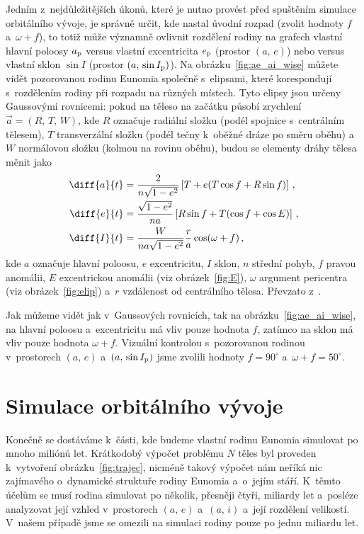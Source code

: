 \documentclass[A4paper, 12pt, oneside]{book}
\begin{document}
Jedním z~nejdůležitějších úkonů, které je nutno provést před spuštěním simulace orbitálního vývoje, je správně určit, kde nastal úvodní rozpad (zvolit hodnoty $f$ a~$\omega+f$), to totiž může významně ovlivnit rozdělení rodiny na grafech vlastní hlavní poloosy $a_{\rm p}$ versus vlastní excentricita $e_{\rm p}$ (prostor $(a,\,e)$) nebo versus vlastní sklon $\sin I$ (prostor $(a,\,\sin I_{\rm p})$). Na obrázku~\ref{fig:ae_ai_wise} můžete vidět pozorovanou rodinu Eunomia společně s~elipsami, které korespondují s~rozdělením rodiny při rozpadu na různých místech. Tyto elipsy jsou určeny Gaussovými rovnicemi: pokud na těleso na začátku působí zrychlení $\vec{a}=(R,\,T,\,W)$, kde $R$ označuje radiální složku (podél spojnice s~centrálním tělesem), $T$ transverzální složku (podél tečny k~oběžné dráze po směru oběhu) a~$W$ normálovou složku (kolmou na rovinu oběhu), budou se elementy dráhy tělesa měnit jako
\begin{align}
	\diff{a}{t}&=\frac{2}{n\sqrt{1-e^2}}\left[T+e(T\cos f+R\sin f)\right] \,, \\
	\diff{e}{t}&=\frac{\sqrt{1-e^2}}{na}\left[R\sin f+T(\cos f+\cos E)\right]\,, \\
	\diff{I}{t}&=\frac{W}{na\sqrt{1-e^2}}\frac{r}{a}\cos(\omega+f)\,,
\end{align}
kde $a$ označuje hlavní poloosu, $e$ excentricitu, $I$ sklon, $n$ střední pohyb, $f$ pravou anomálii, $E$ excentrickou anomálii (viz obrázek~\ref{fig:E}), $\omega$ argument pericentra (viz obrázek~\ref{fig:elip}) a~$r$ vzdálenost od centrálního tělesa. Převzato z~\cite{fmt}.

Jak můžeme vidět jak v~Gaussových rovnicích, tak na obrázku~\ref{fig:ae_ai_wise}, na hlavní poloosu a~excentricitu má vliv pouze hodnota $f$, zatímco na sklon má vliv pouze hodnota $\omega+f$. Vizuální kontrolou s~pozorovanou rodinou v~prostorech $(a,\,e)$ a~$(a,\,\sin I_{\rm p})$ jsme zvolili hodnoty $f=90^\circ$ a~$\omega+f=50^\circ$.
\section{Simulace orbitálního vývoje}

Konečně se dostáváme k~části, kde budeme vlastní rodinu Eunomia simulovat po mnoho miliónů let. Krátkodobý výpočet problému $N$ těles byl proveden k~vytvoření obrázku~\ref{fig:trajec}, nicméně takový výpočet nám neříká nic zajímavého o~dynamické struktuře rodiny Eunomia a~o~jejím stáří. K~těmto účelům se musí rodina simulovat po několik, přesněji čtyři, miliardy let a~posléze analyzovat její vzhled v~prostorech $(a,\,e)$ a~$(a,\,i)$ a~její rozdělení velikostí. V~našem případě jsme se omezili na simulaci rodiny pouze po jednu miliardu let.
\end{document}
